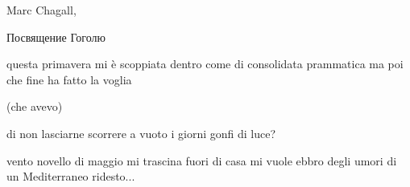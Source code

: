 
\begin{artItem}
	Marc Chagall, \begin{otherlanguage}{russian}%
		Посвящение Гоголю%
	\end{otherlanguage}
\end{artItem}

\begin{poem}
	\begin{stanza}
		questa primavera mi è scoppiata dentro\verseline
		come di consolidata prammatica\verseline
		ma poi che fine ha fatto la voglia
	\end{stanza}

	\begin{stanza}
		(che avevo)
	\end{stanza}

	\begin{stanza}
		di non lasciarne scorrere a vuoto\verseline
		i giorni gonfi di luce?
	\end{stanza}
\end{poem}

\clearpage


\begin{poem}
	\begin{stanza}
		vento novello di maggio\verseline
		mi trascina fuori di casa\verseline
		mi vuole ebbro degli umori\verseline
		di un Mediterraneo ridesto...
	\end{stanza}
\end{poem}
